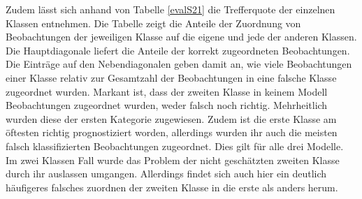 \documentclass{Vorlage}
\begin{document}
Zudem lässt sich anhand von Tabelle \ref{evalS21} die Trefferquote der einzelnen Klassen entnehmen. Die Tabelle zeigt die Anteile der Zuordnung von Beobachtungen der jeweiligen Klasse auf die eigene und jede der anderen Klassen. Die Hauptdiagonale liefert die Anteile der korrekt zugeordneten Beobachtungen. Die Einträge auf den Nebendiagonalen geben damit an, wie viele Beobachtungen einer Klasse relativ zur Gesamtzahl der Beobachtungen in eine falsche Klasse zugeordnet wurden. Markant ist, dass der zweiten Klasse in keinem Modell Beobachtungen zugeordnet wurden, weder falsch noch richtig. Mehrheitlich wurden diese der ersten Kategorie zugewiesen. Zudem ist die erste Klasse am öftesten richtig prognostiziert worden, allerdings wurden ihr auch die meisten falsch klassifizierten Beobachtungen zugeordnet. Dies gilt für alle drei Modelle. Im zwei Klassen Fall wurde das Problem der nicht geschätzten zweiten Klasse durch ihr auslassen umgangen. Allerdings findet sich auch hier ein deutlich häufigeres falsches zuordnen der zweiten Klasse in die erste als anders herum. 
\end{document}
